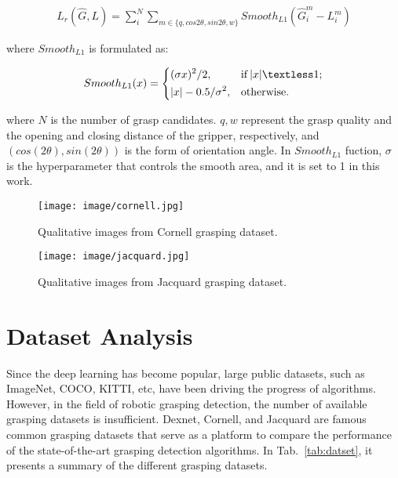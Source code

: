 \documentclass[journal]{IEEEtran}
\begin{document}
\begin{eqnarray}
\label{equation_reg}
L_r(\hat{G}, L) = \sum_{i}^N\sum_{m\in{\{q, cos2\theta, sin2\theta, w\}}} Smooth_{L1}(\hat{G}_i^m - L_i^m)
\end{eqnarray}

where $Smooth_{L1}$ is formulated as:

\[
Smooth_{L1}(x) = \begin{dcases}
(\sigma x)^2 / 2,&\text{if} \: |x| \textless 1;\\
|x| - 0.5/\sigma^2,&\text{otherwise}.
\end{dcases}
\]

where $N$ is the number of grasp candidates. $q, w$ represent the grasp quality and the opening and closing distance of the gripper, respectively, and $(cos(2\theta), sin(2\theta))$ is the form of orientation angle. In $Smooth_{L1}$ fuction, $\sigma$ is the hyperparameter that controls the smooth area, and it is set to 1 in this work.




\begin{figure}[t!]
	\centering
{\texttt{[image: image/cornell.jpg]}}
	\caption{Qualitative images from Cornell grasping dataset.}
	\label{fig:Cornell}
\end{figure} 

\begin{figure}[t!]
	\centering
{\texttt{[image: image/jacquard.jpg]}}
	\caption{Qualitative images from Jacquard grasping dataset.}
	\label{fig:Jacquard}
\end{figure} 

\section{Dataset Analysis}
\label{sec:Dataset}
Since the deep learning has become popular, large public datasets, such as ImageNet, COCO, KITTI, etc, have been driving the progress of algorithms. However, in the field of robotic grasping detection, the number of available grasping datasets is insufficient. Dexnet, Cornell, and Jacquard are famous common grasping datasets that serve as a platform to compare the performance of the state-of-the-art grasping detection algorithms. In Tab.~\ref{tab:datset}, it presents a summary of the different grasping datasets.
\end{document}
